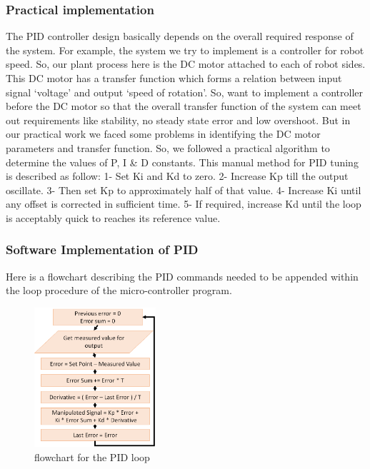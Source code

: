 \documentclass[12pt]{article}
\begin{document}
	\subsubsection{Practical implementation}
	The PID controller design basically depends on the overall required response of the system. For example, the system we try to implement is a controller for robot speed. So, our plant process here is the DC motor attached to each of robot sides. This DC motor has a transfer function which forms a relation between input signal ‘voltage’ and output ‘speed of rotation’. So, want to implement a controller before the DC motor so that the overall transfer function of the system can meet out requirements like stability, no steady state error and low overshoot.
	But in our practical work we faced some problems in identifying the DC motor parameters and transfer function. So, we followed a practical algorithm to determine the values of P, I \& D constants. This manual method for PID tuning is described as follow:
	1-	Set Ki and Kd to zero.
	2-	Increase Kp till the output oscillate.
	3-	Then set Kp to approximately half of that value.
	4-	Increase Ki until any offset is corrected in sufficient time.
	5-	If required, increase Kd until the loop is acceptably quick to reaches its reference value. 
	
	\subsubsection{Software Implementation of PID}
	Here is a flowchart describing the PID commands needed to be appended within the loop procedure of the micro-controller program.
	\begin{figure}[H]
		\centering
		\includegraphics[width =0.4\textwidth]{Fig/pid.png}
		\caption{flowchart for the PID loop}
		\label{fig:pid}
	\end{figure}

\newpage
\end{document}
